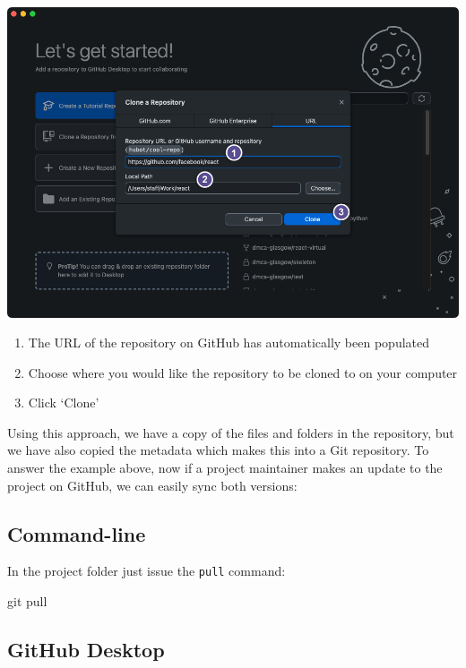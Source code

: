 \documentclass[
  letterpaper,
  DIV=11,
  numbers=noendperiod]{scrartcl}
\newenvironment{Shaded}{\begin{snugshade}}{\end{snugshade}}
\newcommand{\FunctionTok}[1]{\textcolor[rgb]{0.28,0.35,0.67}{#1}}
\newcommand{\NormalTok}[1]{\textcolor[rgb]{0.00,0.23,0.31}{#1}}
\begin{document}
\includegraphics{images/image25.png}

\begin{enumerate}
\def\labelenumi{\arabic{enumi}.}
\item
  The URL of the repository on GitHub has automatically been populated
\item
  Choose where you would like the repository to be cloned to on your
  computer
\item
  Click `Clone'
\end{enumerate}

Using this approach, we have a copy of the files and folders in the
repository, but we have also copied the metadata which makes this into a
Git repository. To answer the example above, now if a project maintainer
makes an update to the project on GitHub, we can easily sync both
versions:

\subsection{Command-line}

In the project folder just issue the \texttt{pull} command:

\begin{Shaded}
\begin{Highlighting}[]
\FunctionTok{git}\NormalTok{ pull}
\end{Highlighting}
\end{Shaded}

\subsection{GitHub Desktop}
\end{document}
